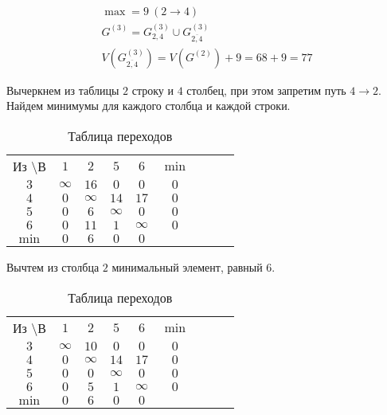\begin{gather*}
\max = 9\ (2 \rightarrow 4) \\
G^{(3)} = G_{2,4}^{(3)} \cup G_{\overline{2,4}}^{(3)} \\
V(G_{\overline{2,4}}^{(3)}) = V(G^{(2)}) + 9 = 68 + 9 = 77
\end{gather*}

Вычеркнем из таблицы $2$ строку и $4$ столбец, при этом запретим путь $4 \rightarrow 2$. Найдем минимумы для каждого столбца и каждой строки.

\begin{table}[H]
\begin{center}
	\def\tabcolsep{15pt}
	\caption{Таблица переходов}
	\label{tab:11}
	\begin{tabular}{|c||c|c|c|c|c|c|c|c|}
		\hline
		Из \textbackslash В & $1$ & $2$ & $5$ & $6$ & $\min$ \\
		\hhline{|=#=|=|=|=|=|=|}
		\hline
		$3$ & $\infty$ & $16$ & $0$ & $0$ & $0$  \\ 
		\hline
		$4$ & $0$ & $\infty$ & $14$ & $17$ & $0$  \\
		\hline
		$5$ & $0$ & $6$ & $\infty$ & $0$ & $0$  \\
		\hline
		$6$ & $0$ & $11$ & $1$ & $\infty$ & $0$  \\ 
		\hhline{|=#=|=|=|=|=|=|}
		$\min$ & $0$ & $6$ & $0$ & $0$ & \\
		\hline 
	\end{tabular}
\end{center}
\end{table}

Вычтем из столбца $2$ минимальный элемент, равный $6$.

\begin{table}[H]
\begin{center}
	\def\tabcolsep{15pt}
	\caption{Таблица переходов}
	\label{tab:11}
	\begin{tabular}{|c||c|c|c|c|c|c|c|c|}
		\hline
		Из \textbackslash В & $1$ & $2$ & $5$ & $6$ & $\min$ \\
		\hhline{|=#=|=|=|=|=|=|}
		\hline
		$3$ & $\infty$ & $10$ & $0$ & $0$ & $0$  \\ 
		\hline
		$4$ & $0$ & $\infty$ & $14$ & $17$ & $0$  \\
		\hline
		$5$ & $0$ & $0$ & $\infty$ & $0$ & $0$  \\
		\hline
		$6$ & $0$ & $5$ & $1$ & $\infty$ & $0$  \\ 
		\hhline{|=#=|=|=|=|=|=|}
		$\min$ & $0$ & $6$ & $0$ & $0$ & \\
		\hline 
	\end{tabular}
\end{center}
\end{table}

